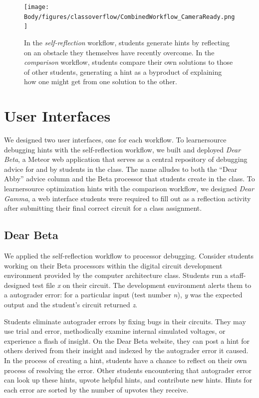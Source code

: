 \begin{figure}
\centering
\texttt{[image: Body/figures/classoverflow/CombinedWorkflow\_CameraReady.png]}
\caption{In the \textit{self-reflection} workflow, students generate hints by reflecting on an obstacle they themselves have recently overcome. In the \textit{comparison} workflow, students compare their own solutions to those of other students, generating a hint as a byproduct of explaining how one might get from one solution to the other.}
\label{fig:workflow}
\end{figure}

\section{User Interfaces} 
We designed two user interfaces, one for each workflow. To learnersource debugging hints with the self-reflection workflow, we built and deployed {\it Dear Beta}, a Meteor web application that serves as a central repository of debugging advice for and by students in the class. The name alludes to both the ``Dear Abby'' advice column and the Beta processor that students create in the class. To learnersource optimization hints with the comparison workflow, we designed {\it Dear Gamma}, a web interface students were required to fill out as a reflection activity after submitting their final correct circuit for a class assignment.

\subsection{Dear Beta}

We applied the self-reflection workflow to processor debugging. Consider students working on their Beta processors within the digital circuit development environment provided by the computer architecture class. Students run a staff-designed test file {\it x} on their circuit. The development environment alerts them to a autograder error: for a particular input (test number {\it n}), {\it y} was the expected output and the student's circuit returned {\it z}. 

Students eliminate autograder errors by fixing bugs in their circuits. They may use trial and error, methodically examine internal simulated voltages, or experience a flash of insight. On the Dear Beta website, they can post a hint for others derived from their insight and indexed by the autograder error it caused. In the process of creating a hint, students have a chance to reflect on their own process of resolving the error.  Other students encountering that autograder error can look up these hints, upvote helpful hints, and contribute new hints. Hints for each error are sorted by the number of upvotes they receive.


